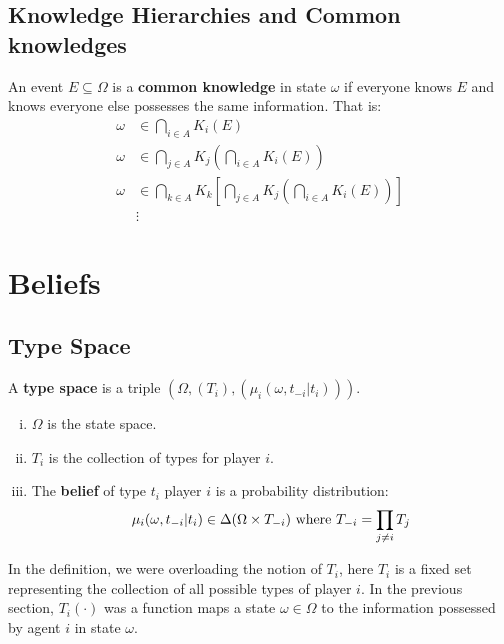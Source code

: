 \documentclass{article}
\begin{document}
   	\subsection{Knowledge Hierarchies and Common knowledges}
   	\begin{definition}
   		An event $E \subseteq \Omega$ is a \textbf{common knowledge} in state $\omega$ if everyone knows $E$ and knows everyone else possesses the same information. That is:
   		\begin{align}
   			\omega &\in \bigcap_{i \in A} K_i(E) \\
   			\omega &\in \bigcap_{j \in A} K_j \left(\bigcap_{i \in A} K_i(E) \right) \\
   			\omega &\in \bigcap_{k \in A} K_k \left[
	   			\bigcap_{j \in A} K_j \left(\bigcap_{i \in A} K_i(E) \right)
   			\right] \\
   			&\vdots
   		\end{align}
   	\end{definition}
   	
   	\section{Beliefs}
   	\subsection{Type Space}
   	\begin{definition}
   		A \textbf{type space} is a triple $(\Omega, (T_i), (\mu_i(\omega, t_{-i}|t_i)))$.
   		\begin{enumerate}[(i)]
	   		\item $\Omega$ is the state space. 
	   		\item $T_i$ is the collection of types for player $i$.
	   		\item The \textbf{belief} of type $t_i$ player $i$ is a probability distribution:
	   		\begin{align}
	   			\mu_i(\omega, t_{-i}|t_i) \in \Delta(\Omega \times T_{-i})\text{{ where }} T_{-i} = \prod_{j \neq i} T_j
	   		\end{align}
	   	\end{enumerate}
   	\end{definition}
   	
   	\begin{remark}
   		In the definition, we were overloading the notion of $T_i$, here $T_i$ is a fixed set representing the collection of all possible types of player $i$. In the previous section, $T_i(\cdot)$ was a function maps a state $\omega \in \Omega$ to the information possessed by agent $i$ in state $\omega$.
   	\end{remark}
   	
\end{document}
